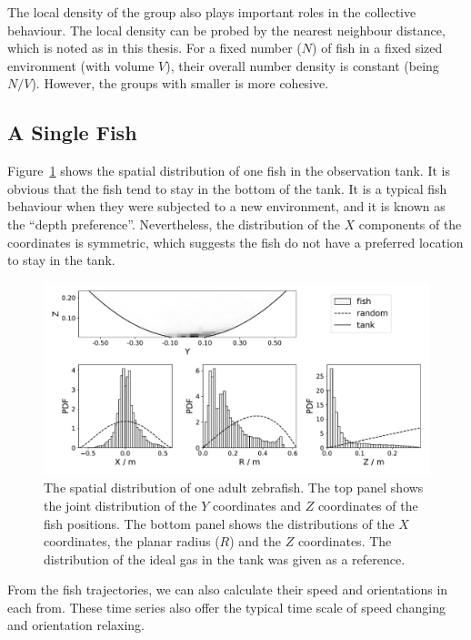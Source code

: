 \documentclass[11pt,twoside]{report}
\begin{document}
The local density of the group also plays important roles in the collective behaviour. The local density can be probed by the nearest neighbour distance, which is noted as {\dnn} in this thesis. For a fixed number ($N$) of fish in a fixed sized environment (with volume $V$), their overall number density is constant (being $N/V$). However, the groups with smaller {\dnn} is more cohesive.


\subsection{A Single Fish}
\label{section:fish_1_3d}


Figure~\ref{fig:density_3d_fish_1} shows the spatial distribution of one fish in the observation tank. It is obvious that the fish tend to stay in the bottom of the tank. It is a typical fish behaviour when they were subjected to a new environment, and it is known as the ``depth preference''.
Nevertheless, the distribution of the $X$ components of the coordinates is symmetric, which suggests the fish do not have a preferred location to stay in the tank.


\begin{figure}
  \includegraphics[width=\linewidth,outer]{density-one-fish}
  \caption[The 3D spatial distribution of one fish]{The spatial distribution of one adult zebrafish. The top panel shows the joint distribution of the $Y$ coordinates and $Z$ coordinates of the fish positions. The bottom panel shows the distributions of the $X$ coordinates, the planar radius ($R$) and the $Z$ coordinates. The distribution of the ideal gas in the tank was given as a reference.}
  \label{fig:density_3d_fish_1}
\end{figure}

From the fish trajectories, we can also calculate their speed and orientations in each from. These time series also offer the typical time scale of speed changing and orientation relaxing.
\end{document}
